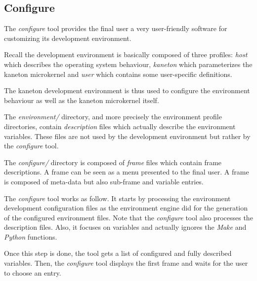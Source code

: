 %
%
%
%
%
%

%
%

\subsection{Configure}
\label{section:configure}

The \textit{configure} tool provides the final user a very user-friendly
software for customizing its development environment.

Recall the development environment is basically composed of three profiles:
\textit{host} which describes the operating system behaviour, \textit{kaneton}
which parameterizes the kaneton microkernel and \textit{user} which contains
some user-specific definitions.

The kaneton development environment is thus used to configure the environment
behaviour as well as the kaneton microkernel itself.

The \textit{environment/} directory, and more precisely the environment
profile directories, contain \textit{description} files which actually
describe the environment variables. These files are not used by the development
environment but rather by the \textit{configure} tool.

The \textit{configure/} directory is composed of \textit{frame} files
which contain frame descriptions. A frame can be seen as a menu presented
to the final user. A frame is composed of meta-data but also sub-frame and
variable entries.

The \textit{configure} tool works as follow. It starts by processing the
environment development configuration files as the environment engine did
for the generation of the configured environment files. Note that the
\textit{configure} tool also processes the description files. Also, it
focuses on variables and actually ignores the \textit{Make} and \textit{Python}
functions.

Once this step is done, the tool gets a list of configured and fully described
variables. Then, the \textit{configure} tool displays the first frame and
waits for the user to choose an entry.

